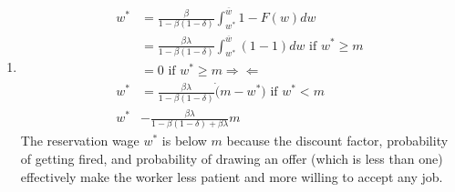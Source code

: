 \documentclass[11pt]{article}
\begin{document}
\begin{enumerate}
\item 
\begin{align*}
w^* &= \frac{\beta}{1 - \beta(1 - \delta)} \int^{\overline{w}}_{w^*} 1 - F(w)dw\\
&= \frac{\beta \lambda}{1 - \beta (1 - \delta)} \int^{\overline{w}}_{w^*} (1 - 1)dw \text{ if } w^* \ge m \\
&= 0 \text{ if } w^* \ge m \Rightarrow\!\Leftarrow \\
w^* &= \frac{\beta \lambda}{1 - \beta (1 - \delta)} \dot (m - w^*) \text{ if } w^* < m \\
w^* &- \frac{\beta \lambda}{1 - \beta(1 - \delta) + \beta \lambda} m
\end{align*}
The reservation wage $w^*$ is below $m$ because the discount factor, probability of getting fired, and probability of drawing an offer (which is less than one) effectively make the worker less patient and more willing to accept any job.


\end{enumerate}
\end{document}
